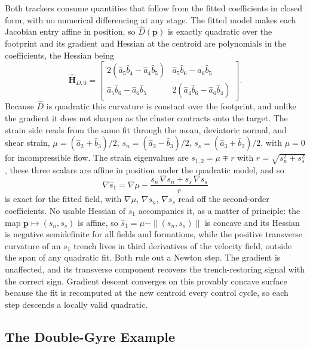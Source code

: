 \documentclass[lettersize,journal]{IEEEtran}
\begin{document}
Both trackers consume quantities that follow from the fitted
coefficients in closed form, with no numerical differencing at any
stage. The fitted model makes each Jacobian entry affine in position,
so $\hat{D}(\mathbf{p})$ is exactly quadratic over the footprint and
its gradient and Hessian at the centroid are polynomials in the
coefficients, the Hessian being
\begin{equation}
    \hat{\mathbf{H}}_{D,0} =
    \begin{bmatrix}
        2(\hat{a}_5 \hat{b}_4 - \hat{a}_4 \hat{b}_5) &
        \hat{a}_5 \hat{b}_6 - \hat{a}_6 \hat{b}_5 \\
        \hat{a}_5 \hat{b}_6 - \hat{a}_6 \hat{b}_5 &
        2(\hat{a}_4 \hat{b}_6 - \hat{a}_6 \hat{b}_4)
    \end{bmatrix}.
    \label{eq:hess_det}
\end{equation}
Because $\hat{D}$ is quadratic this curvature is constant over the
footprint, and unlike the gradient it does not sharpen as the cluster
contracts onto the target. The strain side reads from the same fit
through the mean, deviatoric normal, and shear strain, $\mu =
(\hat{a}_2 + \hat{b}_3)/2$, $s_n = (\hat{a}_2 - \hat{b}_3)/2$, $s_s =
(\hat{a}_3 + \hat{b}_2)/2$, with $\mu = 0$ for incompressible flow.
The strain eigenvalues are $s_{1,2} = \mu \mp r$ with $r = \sqrt{s_n^2
+ s_s^2}$, these three scalars are affine in position under the
quadratic model, and so
\begin{equation}
    \nabla \hat{s}_1 = \nabla\mu
    - \frac{s_n\,\nabla s_n + s_s\,\nabla s_s}{r}
    \label{eq:grad_s1}
\end{equation}
is exact for the fitted field, with $\nabla\mu$, $\nabla s_n$, $\nabla
s_s$ read off the second-order coefficients. No usable Hessian of $s_1$
accompanies it, as a matter of principle: the map
$\mathbf{p} \mapsto (s_n, s_s)$ is affine, so $\hat{s}_1 = \mu -
\|(s_n, s_s)\|$ is concave and its Hessian is negative semidefinite for
all fields and formations, while the positive transverse
curvature of an $s_1$ trench lives in third derivatives of the velocity
field, outside the span of any quadratic fit. Both rule out a Newton
step. The gradient is unaffected, and its transverse
component recovers the trench-restoring signal with the correct sign.
Gradient descent converges on this provably concave surface because the
fit is recomputed at the new centroid every control cycle, so each step
descends a locally valid quadratic.

\subsection{The Double-Gyre Example}
\label{sec:dg_example}
\end{document}
